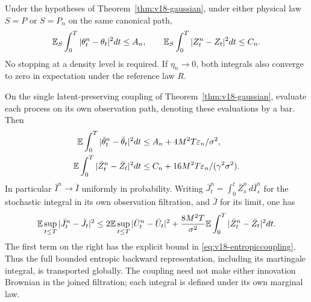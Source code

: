 \begin{theorem}
\label{thm:v19-global}
Under the hypotheses of Theorem~\ref{thm:v18-gaussian}, under either
physical law $S=P$ or $S=P_n$ on the same canonical path,
\begin{equation}\label{eq:v19-globalH2}
 \mathbb E_S\int_0^T|\theta_t^n-\theta_t|^2dt\le A_n,
 \qquad
 \mathbb E_S\int_0^T|Z_t^n-Z_t|^2dt\le C_n.
\end{equation}
No stopping at a density level is required. If $\eta_n\to0$, both
integrals also converge to zero in expectation under the reference law $R$.

On the single latent-preserving coupling of
Theorem~\ref{thm:v18-gaussian}, evaluate each process on its own observation
path, denoting these evaluations by a bar. Then
\begin{align}
 \mathbb E\int_0^T|\bar\theta_t^n-\bar\theta_t|^2dt
   &\le A_n+4M^2T\varepsilon_n/\sigma^2,
       \label{eq:v19-coupledtheta}\\
 \mathbb E\int_0^T|\bar Z_t^n-\bar Z_t|^2dt
   &\le C_n+16M^2T\varepsilon_n/(\gamma^2\sigma^2).
       \label{eq:v19-coupledZ}
\end{align}
In particular $\bar I^n\to\bar I$ uniformly in probability. Writing
$\bar J_t^n=\int_0^t\bar Z_s^n\,d\bar I_s^n$ for the stochastic
integral in its own observation filtration, and $\bar J$ for its limit,
one has
\begin{equation}\label{eq:v19-coupledJ}
 \mathbb E\sup_{t\le T}|\bar J_t^n-\bar J_t|^2
 \le 2\mathbb E\sup_{t\le T}|\bar U_t^n-\bar U_t|^2
       +\frac{8M^2T}{\sigma^2}
                     \mathbb E\int_0^T|\bar Z_t^n-\bar Z_t|^2dt.
\end{equation}
The first term on the right has the explicit bound in
\eqref{eq:v18-entropiccoupling}. Thus the full bounded entropic backward
representation, including its martingale integral, is transported globally.
The coupling need not make either innovation Brownian in the joined
filtration; each integral is defined under its own marginal law.
\end{theorem}
